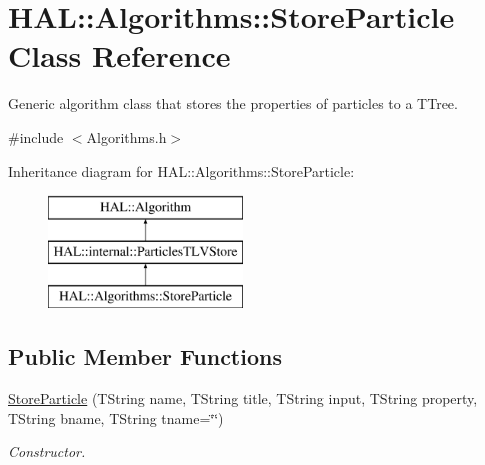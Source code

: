 \hypertarget{class_h_a_l_1_1_algorithms_1_1_store_particle}{\section{H\-A\-L\-:\-:Algorithms\-:\-:Store\-Particle Class Reference}
\label{class_h_a_l_1_1_algorithms_1_1_store_particle}
}


Generic algorithm class that stores the properties of particles to a T\-Tree.  




{\ttfamily \#include $<$Algorithms.\-h$>$}

Inheritance diagram for H\-A\-L\-:\-:Algorithms\-:\-:Store\-Particle\-:\begin{figure}[H]
\begin{center}
\leavevmode
\includegraphics[height=3.000000cm]{class_h_a_l_1_1_algorithms_1_1_store_particle}
\end{center}
\end{figure}
\subsection*{Public Member Functions}
\begin{DoxyCompactItemize}
\item 
\hyperlink{class_h_a_l_1_1_algorithms_1_1_store_particle_a160a46b43875d8968e865fc2335380f3}{Store\-Particle} (T\-String name, T\-String title, T\-String input, T\-String property, T\-String bname, T\-String tname=\char`\"{}\char`\"{})
\begin{DoxyCompactList}\small\item\em Constructor. \end{DoxyCompactList}\end{DoxyCompactItemize}
